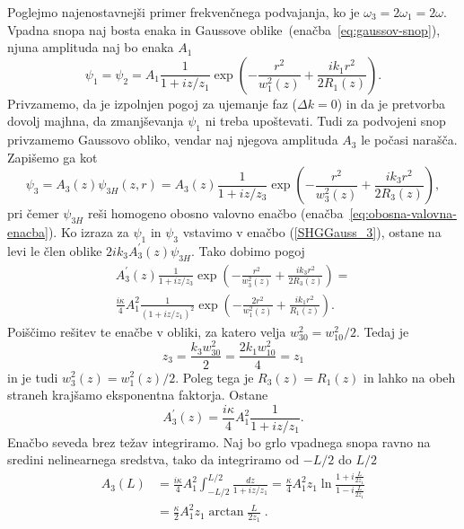 Poglejmo najenostavnejši primer frekvenčnega podvajanja, ko je 
$\omega_{3}=2\omega_{1}=2\omega$.
Vpadna snopa naj bosta enaka in Gaussove oblike~(enačba~\ref{eq:gaussov-snop}), 
njuna amplituda  naj bo enaka $A_1$
\begin{equation}
\psi_{1} = \psi_2 = A_{1}\frac{1}{1+iz/z_1}
\exp\left(-\frac{r^{2}}{w_1^{2}(z)}+\frac{ik_1r^{2}}{2R_1(z)}\right)\!.
\label{8.21}
\end{equation}
Privzamemo, da je izpolnjen pogoj za ujemanje faz 
($\Delta k=0$) in da je pretvorba dovolj majhna, da zmanjševanja $\psi_{1}$
ni treba upoštevati. Tudi za podvojeni snop privzamemo Gaussovo 
obliko, vendar naj njegova amplituda $A_3$ le počasi narašča. Zapišemo ga kot
\begin{equation}
\psi_{3}=A_{3}(z)\psi_{3H}(z,r)=A_{3}(z)\frac{1}{1+iz/z_{3}}
\exp\left(-\frac{r^{2}}{w_{3}^{2}(z)}+\frac{ik_{3}r^{2}}{2R_{3}(z)}\right)\!,
\label{8.22}
\end{equation}
pri čemer $\psi_{3H}$ reši homogeno obosno valovno 
enačbo (enačba~\ref{eq:obosna-valovna-enacba}). Ko izraza za $\psi_{1}$
in $\psi_{3}$ vstavimo v enačbo (\ref{SHGGauss_3}),
ostane na levi le člen oblike $2ik_{3}A_{3}^{\prime}(z)\psi_{3H}$. Tako dobimo pogoj
\begin{equation}
\begin{split}
A_{3}^{\prime}(z)\frac{1}{1+iz/z_3}\exp\left(-\frac{r^{2}}{w_{3}^{2}(z)}+\frac{ik_{3}r^{2}}
{2R_{3}(z)}\right)=\\
\frac{i\kappa}{4}A_{1}^{2}\frac{1}{(1+iz/z_{1})^{2}}\exp\left(-\frac{2r^{2}}
{w_{1}^{2}(z)}+\frac{ik_{1}r^{2}}{R_{1}(z)}\right)\!.
\label{8.23}
\end{split}
\end{equation}
Poiščimo rešitev te enačbe v obliki, za katero velja $w_{30}^{2}=w_{10}^{2}/2$. Tedaj je 
\begin{equation}
z_{3}=\frac{k_{3}w_{30}^{2}}{2}=\frac{2k_{1}w_{10}^{2}}{4}=z_{1}
\end{equation}
in je tudi $w_{3}^{2}(z)=w_{1}^{2}(z)/2$. Poleg tega je $R_{3}(z)=R_{1}(z)$
in lahko na obeh straneh krajšamo eksponentna faktorja. Ostane 
\begin{equation}
A_{3}^{\prime}(z)=\frac{i\kappa}{4}A_{1}^{2}\frac{1}{1+iz/z_1}.
\label{8.24}
\end{equation}
Enačbo seveda brez težav integriramo. Naj bo grlo vpadnega
snopa ravno na sredini nelinearnega sredstva, tako da integriramo
od $-L/2$ do $L/2$
\begin{align}
A_{3}(L) & =  \frac{i\kappa}{4}A_{1}^{2}\int_{-L/2}^{L/2}\frac{dz}{1+iz/z_1} 
  = \frac{\kappa}{4}A_{1}^{2}z_{1}\ln\frac{1+i\frac{L}{2z_{1}}}{1-i\frac{L}{2z_{1}}}\nonumber \\
 & =  \frac{\kappa}{2}A_{1}^{2}z_{1}\arctan\frac{L}{2z_{1}}\;.
\end{align}
